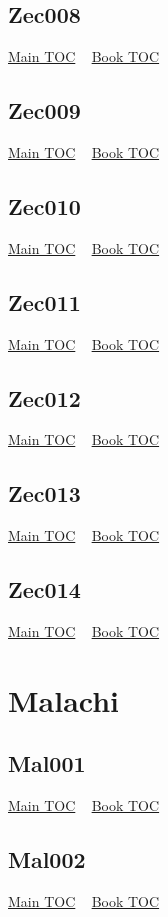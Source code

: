 \documentclass{book}
\begin{document}
  \section{Zec008}\hyperlink{toc}{Main TOC} ~ \hyperref[subsec:Zec]{Book TOC} 
  \section{Zec009}\hyperlink{toc}{Main TOC} ~ \hyperref[subsec:Zec]{Book TOC} 
  \section{Zec010}\hyperlink{toc}{Main TOC} ~ \hyperref[subsec:Zec]{Book TOC} 
  \section{Zec011}\hyperlink{toc}{Main TOC} ~ \hyperref[subsec:Zec]{Book TOC} 
  \section{Zec012}\hyperlink{toc}{Main TOC} ~ \hyperref[subsec:Zec]{Book TOC} 
  \section{Zec013}\hyperlink{toc}{Main TOC} ~ \hyperref[subsec:Zec]{Book TOC} 
  \section{Zec014}\hyperlink{toc}{Main TOC} ~ \hyperref[subsec:Zec]{Book TOC} 
  \chapter{Malachi} \label{subsec:Mal} \begin{multicols}{2} \minitoc \end{multicols}
  \section{Mal001}\hyperlink{toc}{Main TOC} ~ \hyperref[subsec:Mal]{Book TOC} 
  \section{Mal002}\hyperlink{toc}{Main TOC} ~ \hyperref[subsec:Mal]{Book TOC} 
\end{document}
